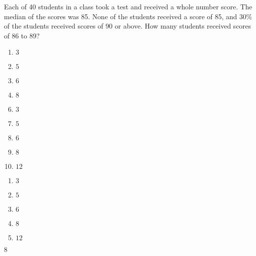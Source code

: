 Each of 40 students in a class took a test and received a whole number score. The median of the scores was 85. None of the students received a score of 85, and $30\%$ of the students received scores of 90 or above. How many students received scores of 86 to 89?

\ifsat
	\begin{enumerate}[label=\Alph*)]
		\item   $3$
		\item  $5$ 
		\item  $6$ 
		\item  $8$ %
	\end{enumerate}
\else
\fi

\ifacteven
	\begin{enumerate}[label=\textbf{\Alph*.},itemsep=\fill,align=left]
		\setcounter{enumii}{5}
		\item   $3$
		\item  $5$ 
		\item  $6$ 
		\addtocounter{enumii}{1}
		\item  $8$ %
		\item  $12$ 
	\end{enumerate}
\else
\fi

\ifactodd
	\begin{enumerate}[label=\textbf{\Alph*.},itemsep=\fill,align=left]
		\item   $3$
		\item  $5$ 
		\item  $6$ 
		\item  $8$ %
		\item  $12$ 
	\end{enumerate}
\else
\fi

\ifgridin
  $8$ %

\else
\fi

